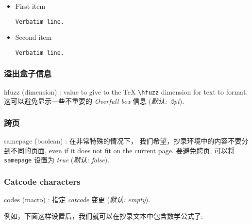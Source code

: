 \documentclass[twoside]{article}
\newcommand\cs[1]{\texttt{\textbackslash#1}}
\providecommand\optname[1]{\textsf{#1}}
\newenvironment{optlist}{\begin{description}%
  \renewcommand\makelabel[1]{%
    \descriptionlabel{\mdseries\optname{##1}}}%
  \itemsep0.25\itemsep}%
 {\end{description}}
\newcommand\verbatimTxt{抄录}
\begin{document}
{%
\begin{SideBySideExample}
  \begin{itemize}
    \item First item
    \begin{Verbatim}[frame=single]
  Verbatim line.
    \end{Verbatim}
    \item Second item
    \begin{Verbatim}[frame=single,
                     resetmargins=true]
  Verbatim line.
    \end{Verbatim}
  \end{itemize}
\end{SideBySideExample}
}

\subsubsection{溢出盒子信息}

\begin{optlist}
  \item[hfuzz (dimension)]: value to give to the \TeX{} \cs{hfuzz} dimension
  for text to format. 这可以避免显示一些不重要的
  \emph{Overfull box} 信息 (\emph{默认:~2pt}).
\end{optlist}

\subsubsection{跨页}

\begin{optlist}
  \item[samepage (boolean)]: 在非常特殊的情况下， 
  我们希望，{\verbatimTxt}环境中的内容不要分到不同的页面, even if it does not fit on the current page. 要避免跨页, 可以将
  \texttt{samepage} 设置为 \emph{true} (\emph{默认: false}).
\end{optlist}

\subsubsection{Catcode characters}

\begin{optlist}
  \item[codes (macro)]: 指定 \emph{catcode} 变更 (\emph{默认:
  empty}).
\end{optlist}

例如，下面这样设置后，我们就可以在抄录文本中包含数学公式了:
\end{document}
